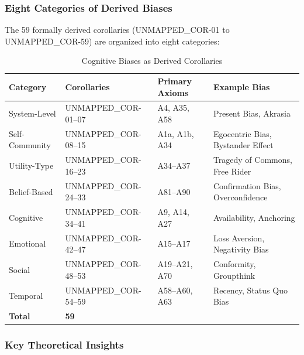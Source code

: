 \subsubsection{Eight Categories of Derived Biases}

The 59 formally derived corollaries (UNMAPPED_COR-01 to UNMAPPED_COR-59) are organized into eight categories:

\begin{table}[htbp]
\centering
\caption{Cognitive Biases as Derived Corollaries}
\label{tab:bias-corollaries-summary}
\renewcommand{\arraystretch}{1.3}
\begin{tabular}{@{}llll@{}}
\toprule
\textbf{Category} & \textbf{Corollaries} & \textbf{Primary Axioms} & \textbf{Example Bias} \\
\midrule
System-Level & UNMAPPED_COR-01--07 & A4, A35, A58 & Present Bias, Akrasia \\
Self-Community & UNMAPPED_COR-08--15 & A1a, A1b, A34 & Egocentric Bias, Bystander Effect \\
Utility-Type & UNMAPPED_COR-16--23 & A34--A37 & Tragedy of Commons, Free Rider \\
Belief-Based & UNMAPPED_COR-24--33 & A81--A90 & Confirmation Bias, Overconfidence \\
Cognitive & UNMAPPED_COR-34--41 & A9, A14, A27 & Availability, Anchoring \\
Emotional & UNMAPPED_COR-42--47 & A15--A17 & Loss Aversion, Negativity Bias \\
Social & UNMAPPED_COR-48--53 & A19--A21, A70 & Conformity, Groupthink \\
Temporal & UNMAPPED_COR-54--59 & A58--A60, A63 & Recency, Status Quo Bias \\
\midrule
\textbf{Total} & \textbf{59} & & \\
\bottomrule
\end{tabular}
\end{table}

\subsubsection{Key Theoretical Insights}

